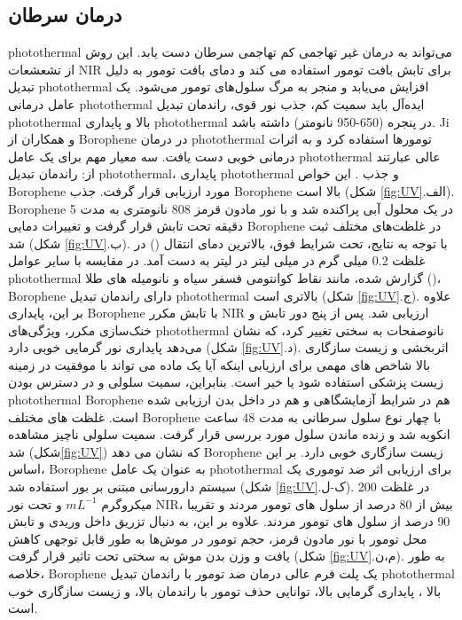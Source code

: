 \subsection{درمان سرطان}
\gls{photothermal} می‌تواند به درمان غیر تهاجمی کم تهاجمی سرطان دست یابد. این روش از تشعشعات \gls{NIR} برای تابش بافت تومور استفاده می کند و دمای بافت تومور به دلیل تبدیل \gls{photothermal} افزایش می‌یابد و منجر به مرگ سلول‌های تومور می‌شود.\cite{prasadMechanismCellDeath2007} یک عامل درمانی \gls{photothermal} ایده‌آل باید سمیت کم، جذب نور قوی، راندمان تبدیل \gls{photothermal} بالا و پایداری \gls{photothermal} در پنجره  (650-950 نانومتر) داشته باشد.\cite{jangGoldNanorodPhotosensitizerComplex2011, chengPEGylatedWS2Nanosheets2014} \gls{Ji} و همکاران \cite{jiNovelTopDownSynthesis2018} از \gls{Borophene} در درمان \gls{photothermal} تومورها استفاده کرد و به اثرات درمانی خوبی دست یافت. سه معیار مهم برای یک عامل \gls{photothermal} عالی عبارتند از: راندمان تبدیل \gls{photothermal}، پایداری \gls{photothermal} و جذب . این خواص \gls{Borophene} مورد ارزیابی قرار گرفت. جذب  \gls{Borophene} بالا است (شکل \ref{fig:UV}.الف). \gls{Borophene} در یک محلول آبی پراکنده شد و با نور مادون قرمز 808 نانومتری  به مدت 5 دقیقه تحت تابش قرار گرفت و تغییرات دمایی \gls{Borophene} در غلظت‌های مختلف ثبت شد (شکل \ref{fig:UV}.ب). با توجه به نتایج، تحت شرایط فوق، بالاترین دمای انتقال () در غلظت 0.2 میلی گرم در میلی لیتر در لیتر به دست آمد. در مقایسه با سایر عوامل \gls{photothermal} گزارش شده، مانند نقاط کوانتومی فسفر سیاه  و نانومیله های طلا ()، \gls{Borophene} دارای راندمان تبدیل \gls{photothermal} بالاتری  است (شکل \ref{fig:UV}.ج). علاوه بر این، پایداری \gls{Borophene} با تابش مکرر \gls{NIR} ارزیابی شد. پس از پنج دور تابش و خنک‌سازی مکرر، ویژگی‌های \gls{photothermal} نانوصفحات به سختی تغییر کرد، که نشان می‌دهد پایداری نور گرمایی خوبی دارد (شکل \ref{fig:UV}.د). اثربخشی و زیست سازگاری بالا شاخص های مهمی برای ارزیابی اینکه آیا یک ماده می تواند با موفقیت در زمینه زیست پزشکی استفاده شود یا خیر است. بنابراین، سمیت سلولی و در دسترس بودن \gls{photothermal} \gls{Borophene} هم در شرایط آزمایشگاهی و هم در داخل بدن ارزیابی شده است. غلظت های مختلف \gls{Borophene} با چهار نوع سلول سرطانی به مدت 48 ساعت انکوبه شد و زنده ماندن سلول مورد بررسی قرار گرفت. سمیت سلولی ناچیز مشاهده شد (شکل\ref{fig:UV}) که نشان می دهد \gls{Borophene} زیست سازگاری خوبی دارد. بر این اساس، \gls{Borophene} به عنوان یک عامل \gls{photothermal} برای ارزیابی اثر ضد توموری یک سیستم دارورسانی مبتنی بر بور استفاده شد (شکل \ref{fig:UV}.ک-ل). در غلظت  200 میکروگرم $mL^{-1}$ و تحت نور \gls{NIR}، بیش از 80 درصد از سلول های تومور  مردند و تقریبا 90 درصد از سلول های تومور  مردند. علاوه بر این، به دنبال تزریق داخل وریدی  و تابش محل تومور با نور مادون قرمز، حجم تومور در موش‌ها به طور قابل توجهی کاهش یافت و وزن بدن موش به سختی تحت تاثیر قرار گرفت (شکل \ref{fig:UV}.م،ن). به طور خلاصه، \gls{Borophene} یک پلت فرم عالی درمان ضد تومور با راندمان تبدیل \gls{photothermal} بالا ، پایداری گرمایی بالا، توانایی حذف تومور با راندمان بالا، و زیست سازگاری خوب است.

